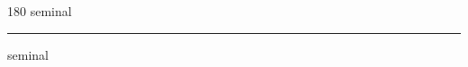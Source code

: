 
\begin{frame}
\begin{center}
\begin{turn}{180}
{\fontsize{2.5cm}{1em}\selectfont seminal}
\end{turn}
\vspace{1em}\par  
\hrule
\vspace{1em}\par  
{\fontsize{2.5cm}{1em}\selectfont seminal}
\end{center}
\end{frame}
